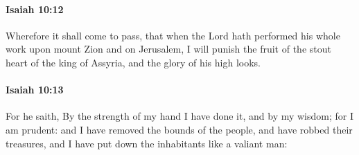 		\paragraph{Isaiah 10:12} %
			\label{ISAIAH-10-12}

			Wherefore it shall come to pass, that when the Lord hath performed his whole work upon mount Zion and on Jerusalem, I will punish the fruit of the stout heart of the king of Assyria, and the glory of his high looks.


		\paragraph{Isaiah 10:13} %
			\label{ISAIAH-10-13}

			For he saith, By the strength of my hand I have done it, and by my wisdom; for I am prudent: and I have removed the bounds of the people, and have robbed their treasures, and I have put down the inhabitants like a valiant man:

